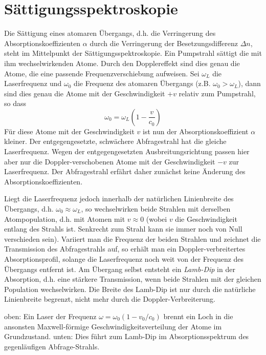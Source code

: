 \section{Sättigungsspektroskopie}

Die Sättigung eines atomaren Übergangs, d.h. die Verringerung des Absorptionskoeffizienten $\alpha$ durch die Verringerung der Besetzungsdifferenz $\Delta n$, steht im Mittelpunkt der Sättigungsspektroskopie.  Ein Pumpstrahl sättigt die mit ihm wechselwirkenden Atome. Durch den Dopplereffekt sind dies genau die Atome, die eine passende Frequenzverschiebung aufweisen. Sei $\omega_L$ die Laserfrequenz und $\omega_0$ die Frequenz des atomaren Übergangs (z.B. $\omega_0 > \omega_L$), dann sind dies genau die Atome mit der Geschwindigkeit $+v$ relativ zum Pumpstrahl, so dass
\begin{equation}
	\omega_0 = \omega_L \left( 1 - \frac{v}{c_0} \right)
\end{equation}
Für diese Atome mit der Geschwindigkeit $v$ ist nun der Absorptionskoeffizient $\alpha$ kleiner. Der entgegengesetzte, schwächere Abfragestrahl hat die gleiche Laserfrequenz. Wegen der entgegengesetzten Ausbreitungsrichtung passen hier aber nur die Doppler-verschobenen Atome mit der Geschwindigkeit $-v$ zur Laserfrequenz. Der Abfragestrahl erfährt daher zunächst keine Änderung des Absorptionskoeffizienten.

Liegt die Laserfrequenz jedoch innerhalb der natürlichen Linienbreite des Übergangs, d.h. $\omega_0 \approx \omega_L$, so wechselwirken beide Strahlen mit derselben Atompopulation, d.h. mit Atomen mit $v \approx 0$ (wobei $v$ die Geschwindigkeit entlang des Strahls ist. Senkrecht zum Strahl kann sie immer noch von Null verschieden sein). Variiert man die Frequenz der beiden Strahlen und zeichnet die Transmission des Abfragestrahls auf, so erhält man ein Doppler-verbreitertes Absorptionsprofil, solange die Laserfrequenz noch weit von der Frequenz des Übergangs entfernt ist. Am Übergang selbst entsteht ein \emph{Lamb-Dip} in der Absorption, d.h. eine stärkere Transmission, wenn beide Strahlen mit der gleichen Population wechselwirken. Die Breite des Lamb-Dip ist nur durch die natürliche Linienbreite begrenzt, nicht mehr durch die Doppler-Verbreiterung.

\begin{marginfigure}
	\caption{oben: Ein Laser der Frequenz $\omega = \omega_0 (1 - v_0/c_0)$ brennt ein Loch in die ansonsten Maxwell-förmige Geschwindigkeitsverteilung der Atome im Grundzustand. unten: Dies führt zum Lamb-Dip im Absorptionsspektrum des gegenläufigen Abfrage-Strahls.}
\end{marginfigure}

